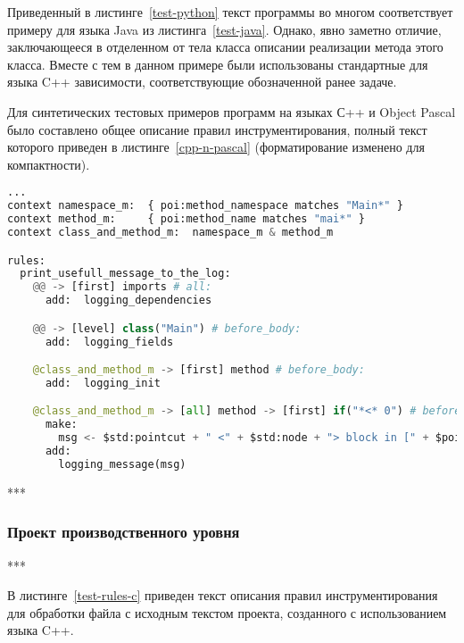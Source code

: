 Приведенный в листинге~\ref{test-python} текст программы во многом соответствует примеру для языка Java из листинга~\ref{test-java}.
Однако, явно заметно отличие, заключающееся в отделенном от тела класса описании реализации метода этого класса.
Вместе с тем в данном примере были использованы стандартные для языка C++ зависимости, соответствующие обозначенной ранее задаче.

Для синтетических тестовых примеров программ на языках С++ и Object Pascal было составлено общее описание правил инструментирования, полный текст которого приведен в листинге~\ref{cpp-n-pascal} (форматирование изменено для компактности).

\begin{lstlisting}[frame=single, language=Python, label={test-rules-cpp-n-pascal}, caption={Описание правил инструментирования.}]
...
context namespace_m:  { poi:method_namespace matches "Main*" }
context method_m:     { poi:method_name matches "mai*" }
context class_and_method_m:  namespace_m & method_m

rules:
  print_usefull_message_to_the_log:
    @@ -> [first] imports # all:
      add:  logging_dependencies

    @@ -> [level] class("Main") # before_body:
      add:  logging_fields

    @class_and_method_m -> [first] method # before_body:
      add:  logging_init

    @class_and_method_m -> [all] method -> [first] if("*<* 0") # before:
      make:
        msg <- $std:pointcut + " <" + $std:node + "> block in [" + $poi:method_name_full + "] method";
      add:
        logging_message(msg)
\end{lstlisting}

***

\subsubsection{Проект производственного уровня}

***

В листинге~\ref{test-rules-c} приведен текст описания правил инструментирования для обработки файла с исходным текстом проекта, созданного с использованием языка C++.

